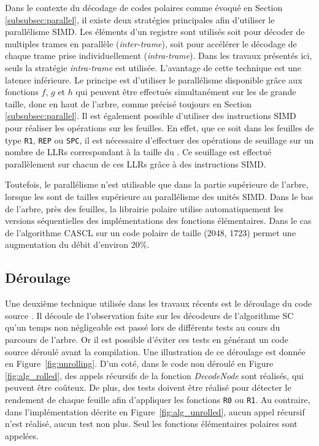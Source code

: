 Dans le contexte du décodage de codes polaires comme évoqué en Section \ref{subsubsec:parallel}, il existe deux stratégies principales afin d'utiliser le parallélisme SIMD. Les éléments d'un registre sont utilisés soit pour décoder de multiples trames en parallèle (\textit{inter-trame}), soit pour accélérer le décodage de chaque trame prise individuellement (\textit{intra-trame}). Dans les travaux présentés ici, seuls la stratégie \textit{intra-trame} est utilisée. L'avantage de cette technique est une latence inférieure. Le principe est d'utiliser le parallélisme disponible grâce aux fonctions $f$, $g$ et $h$ qui peuvent être effectués simultanément sur les \noeuds de grande taille, donc en haut de l'arbre, comme précisé toujours en Section \ref{subsubsec:parallel}. Il est également possible d'utiliser des instructions SIMD pour réaliser les opérations sur les feuilles. En effet, que ce soit dans les feuilles de type \texttt{R1}, \texttt{REP} ou \texttt{SPC}, il est nécessaire d'effectuer des opérations de seuillage sur un nombre de LLRs correspondant à la taille du \noeud. Ce seuillage est effectué parallèlement sur chacun de ces LLRs grâce à des instructions SIMD.

Toutefois, le parallélisme n'est utilisable que dans la partie supérieure de l'arbre, lorsque les \noeuds sont de tailles supérieure au parallélisme des unités SIMD. Dans le bas de l'arbre, près des feuilles, la librairie polaire \cite{cassagne_efficient_2015} utilise automatiquement les versions séquentielles des implémentations des fonctions élémentaires. Dans le cas de l'algorithme CASCL sur un code polaire de taille (2048, 1723) permet une augmentation du débit d'environ 20\%.


\subsection{Déroulage}
\label{subsec:unroll}
Une deuxième technique utilisée dans les travaux récents est le déroulage du code source \cite{sarkis_autogenerating_2014,giard_fast_2014,cassagne_efficient_2015,cassagne_energy_2016}. Il découle de l'observation faite sur les décodeurs de l'algorithme SC qu'un temps non négligeable est passé lors de différents tests au cours du parcours de l'arbre. Or il est possible d'éviter ces tests en générant un code source déroulé avant la compilation. Une illustration de ce déroulage est donnée en Figure~\ref{fig:unrolling}. D'un coté, dans le code non déroulé en Figure \ref{fig:alg_rolled}, des appels récursifs de la fonction \textit{DecodeNode} sont réalisés, qui peuvent être coûteux. De plus, des tests doivent être réalisé pour détecter le rendement de chaque feuille afin d'appliquer les fonctions \texttt{R0} ou \texttt{R1}. Au contraire, dans l'implémentation décrite en Figure~\ref{fig:alg_unrolled}, aucun appel récursif n'est réalisé, aucun test non plus. Seul les fonctions élémentaires polaires sont appelées.

